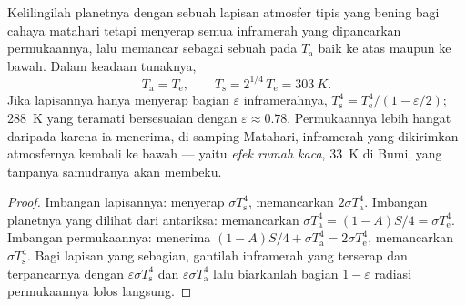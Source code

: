 \begin{proposition}\label{prop:b2:thermal-radiation:greenhouse}
Kelilingilah planetnya dengan sebuah lapisan atmosfer tipis yang bening
bagi cahaya matahari tetapi menyerap semua inframerah yang dipancarkan permukaannya, lalu
memancar sebagai sebuah  pada $T_{\text{a}}$ baik ke atas maupun ke bawah. Dalam
keadaan tunaknya,
\[
T_{\text{a}} = T_{\text{e}}, \qquad
T_{\text{s}} = 2^{1/4}\,T_{\text{e}} = \qty{303}{K} .
\]
Jika lapisannya hanya menyerap bagian $\varepsilon$ inframerahnya,
$T_{\text{s}}^4 = T_{\text{e}}^4/(1 - \varepsilon/2)$; \qty{288}{K} yang
teramati bersesuaian dengan $\varepsilon \approx 0.78$. Permukaannya lebih
hangat daripada  karena ia menerima, di samping
Matahari, inframerah yang dikirimkan atmosfernya kembali ke bawah --- yaitu
\emph{efek rumah kaca}, \qty{33}{K} di Bumi,
yang tanpanya samudranya akan membeku.
\end{proposition}

\begin{proof}
Imbangan lapisannya: menyerap $\sigma T_{\text{s}}^4$, memancarkan $2\sigma
T_{\text{a}}^4$. Imbangan planetnya yang dilihat dari antariksa: memancarkan $\sigma
T_{\text{a}}^4 = (1 - A)S/4 = \sigma T_{\text{e}}^4$. Imbangan
permukaannya: menerima $(1 - A)S/4 + \sigma T_{\text{a}}^4 = 2\sigma T_{\text{e}}^4$,
memancarkan $\sigma T_{\text{s}}^4$. Bagi lapisan yang sebagian, gantilah
inframerah yang terserap dan terpancarnya dengan $\varepsilon\sigma T_{\text{s}}^4$ dan
$\varepsilon\sigma T_{\text{a}}^4$ lalu biarkanlah bagian $1 - \varepsilon$
radiasi permukaannya lolos langsung.
\end{proof}

